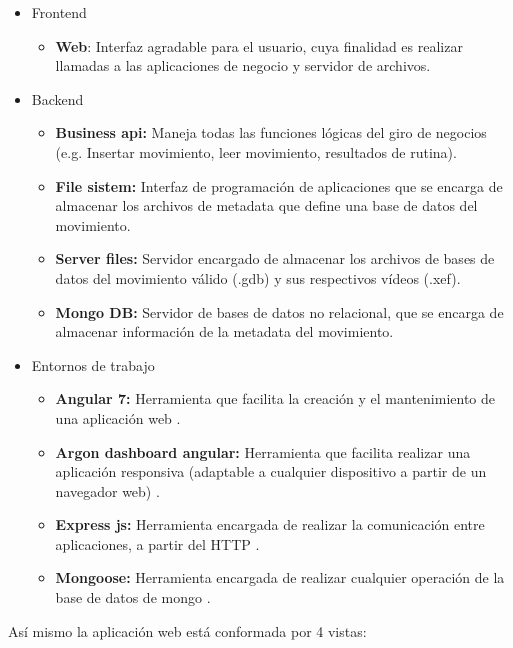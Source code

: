 \begin{itemize}
\item Frontend
	\begin{itemize}
	\item \textbf{Web}: Interfaz agradable para el usuario, cuya finalidad es realizar llamadas a las aplicaciones de negocio y servidor de archivos.
	\end{itemize}
\item Backend
	\begin{itemize}
	\item \textbf{Business api:} Maneja todas las  funciones l\'ogicas del giro de negocios (e.g. Insertar movimiento, leer movimiento, resultados de rutina).
	\item \textbf{File sistem:} Interfaz de programaci\'on de aplicaciones que se encarga de almacenar los archivos de metadata que define una base de datos del movimiento.
		\item \textbf{Server files:} Servidor encargado de almacenar los archivos de bases de datos del movimiento v\'alido (.gdb) y sus respectivos v\'ideos (.xef).
		\item \textbf{Mongo DB:} Servidor de bases de datos no relacional, que se encarga de almacenar informaci\'on de la metadata del movimiento.
	\end{itemize}
\item Entornos de trabajo
\begin{itemize}
\item \textbf{Angular 7:} Herramienta que facilita la creaci\'on y el mantenimiento de una aplicaci\'on web \cite{angular2019}.
\item \textbf{Argon dashboard angular:} Herramienta  que facilita realizar una aplicaci\'on responsiva (adaptable a cualquier dispositivo a partir de un navegador web) \cite{argonDash}.
\item \textbf{Express js:} Herramienta encargada de realizar la comunicaci\'on entre aplicaciones, a partir del \acrlong{HTTP} \cite{fileSistem2019}.
\item \textbf{Mongoose:} Herramienta encargada de realizar cualquier operaci\'on de la base de datos de mongo \cite{mongoose2019}.
\end{itemize}
\end{itemize}
As\'i mismo la aplicaci\'on web est\'a conformada por 4 vistas:
